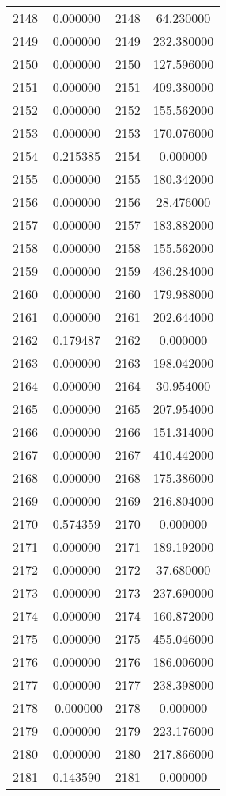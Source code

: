 \documentclass[12pt]{article}
\begin{document}
\begin{longtable}{@{}cccc@{}}
2148 & 0.000000 & 2148 & 64.230000 \\
2149 & 0.000000 & 2149 & 232.380000 \\
2150 & 0.000000 & 2150 & 127.596000 \\
2151 & 0.000000 & 2151 & 409.380000 \\
2152 & 0.000000 & 2152 & 155.562000 \\
2153 & 0.000000 & 2153 & 170.076000 \\
2154 & 0.215385 & 2154 & 0.000000 \\
2155 & 0.000000 & 2155 & 180.342000 \\
2156 & 0.000000 & 2156 & 28.476000 \\
2157 & 0.000000 & 2157 & 183.882000 \\
2158 & 0.000000 & 2158 & 155.562000 \\
2159 & 0.000000 & 2159 & 436.284000 \\
2160 & 0.000000 & 2160 & 179.988000 \\
2161 & 0.000000 & 2161 & 202.644000 \\
2162 & 0.179487 & 2162 & 0.000000 \\
2163 & 0.000000 & 2163 & 198.042000 \\
2164 & 0.000000 & 2164 & 30.954000 \\
2165 & 0.000000 & 2165 & 207.954000 \\
2166 & 0.000000 & 2166 & 151.314000 \\
2167 & 0.000000 & 2167 & 410.442000 \\
2168 & 0.000000 & 2168 & 175.386000 \\
2169 & 0.000000 & 2169 & 216.804000 \\
2170 & 0.574359 & 2170 & 0.000000 \\
2171 & 0.000000 & 2171 & 189.192000 \\
2172 & 0.000000 & 2172 & 37.680000 \\
2173 & 0.000000 & 2173 & 237.690000 \\
2174 & 0.000000 & 2174 & 160.872000 \\
2175 & 0.000000 & 2175 & 455.046000 \\
2176 & 0.000000 & 2176 & 186.006000 \\
2177 & 0.000000 & 2177 & 238.398000 \\
2178 & -0.000000 & 2178 & 0.000000 \\
2179 & 0.000000 & 2179 & 223.176000 \\
2180 & 0.000000 & 2180 & 217.866000 \\
2181 & 0.143590 & 2181 & 0.000000 \\

\end{longtable}
\end{document}
